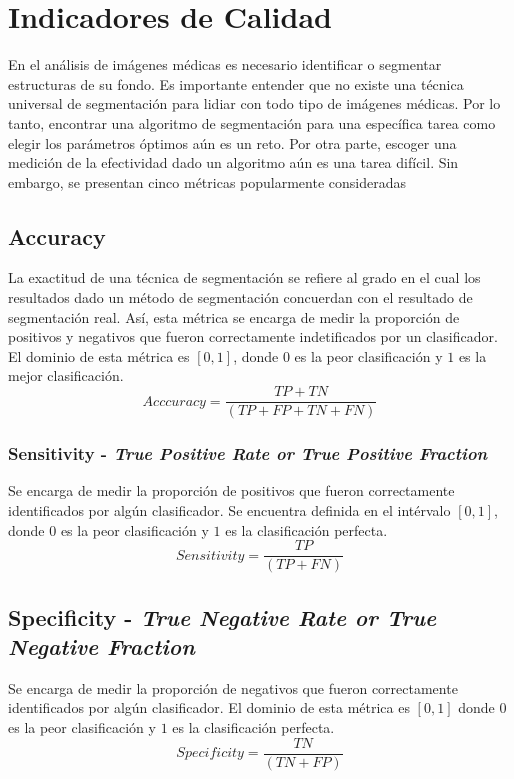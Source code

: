 \documentclass[preprint,12pt]{elsarticle}
\begin{document}
\section{Indicadores de Calidad}\label{sec:4}

En el análisis de imágenes médicas es necesario identificar o segmentar estructuras de su fondo.
%
Es importante entender que no existe una técnica universal de segmentación para lidiar con todo tipo de imágenes médicas.
%
Por lo tanto, encontrar una algoritmo de segmentación para una específica tarea como elegir los parámetros óptimos aún es un reto.
%
Por otra parte, escoger una medición de la efectividad dado un algoritmo aún es una tarea difícil.
%
Sin embargo, se presentan cinco métricas popularmente consideradas~\cite{fenster2006evaluation}

\subsection{Accuracy}
La exactitud de una técnica de segmentación se refiere al grado en el cual los resultados dado un método de segmentación concuerdan con el resultado de segmentación real.
%
Así, esta métrica se encarga de medir la proporción de positivos y negativos que fueron correctamente indetificados por un clasificador.
%
El dominio de esta métrica es $[0,1]$, donde $0$ es la peor clasificación y $1$ es la mejor clasificación.
%
\begin{equation}
    Acccuracy = \frac{TP + TN}{(TP + FP + TN +FN)}
\end{equation}
\subsubsection{Sensitivity - \textit{True Positive Rate or True Positive Fraction}}
Se encarga de medir la proporción de positivos que fueron correctamente identificados por algún clasificador.
%
Se encuentra definida en el intérvalo $[0,1]$, donde $0$ es la peor clasificación y $1$ es la clasificación perfecta.
\begin{equation}
    Sensitivity = \frac{TP}{(TP+ FN)}
\end{equation}

\subsection{Specificity - \textit{True Negative Rate or True Negative Fraction}}
Se encarga de medir la proporción de negativos que fueron correctamente identificados por algún clasificador. 
%
El dominio de esta métrica es $[0, 1]$ donde $0$ es la peor clasificación y $1$ es la clasificación perfecta.
\begin{equation}
    Specificity =  \frac{TN}{(TN + FP)}
\end{equation}
\end{document}
